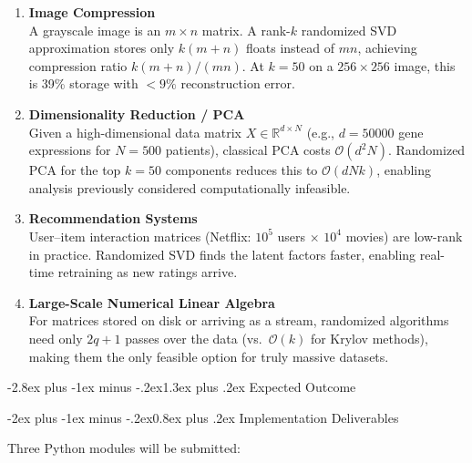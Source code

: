 \documentclass[12pt,a4paper]{article}
\makeatletter
\renewcommand{\section}{\@startsection{section}{1}{\z@}
  {-2.8ex plus -1ex minus -.2ex}{1.3ex plus .2ex}
  {\large\bfseries\color{deepblue}}}
\renewcommand{\subsection}{\@startsection{subsection}{2}{\z@}
  {-2ex plus -1ex minus -.2ex}{0.8ex plus .2ex}
  {\normalsize\bfseries\color{deepblue}}}
\makeatother
\begin{document}
\begin{enumerate}[leftmargin=1.8em, itemsep=5pt]
  \item \textbf{Image Compression}\\
    A grayscale image is an $m \times n$ matrix. A rank-$k$ randomized SVD approximation
    stores only $k(m+n)$ floats instead of $mn$, achieving compression ratio $k(m+n)/(mn)$.
    At $k=50$ on a $256 \times 256$ image, this is 39\% storage with $<9\%$ reconstruction error.

  \item \textbf{Dimensionality Reduction / PCA}\\
    Given a high-dimensional data matrix $X \in \mathbb{R}^{d \times N}$ (e.g., $d=50000$
    gene expressions for $N=500$ patients), classical PCA costs $\mathcal{O}(d^2 N)$.
    Randomized PCA for the top $k=50$ components reduces this to $\mathcal{O}(dNk)$,
    enabling analysis previously considered computationally infeasible.

  \item \textbf{Recommendation Systems}\\
    User--item interaction matrices (Netflix: $10^5$ users $\times$ $10^4$ movies) are
    low-rank in practice. Randomized SVD finds the latent factors faster, enabling
    real-time retraining as new ratings arrive.

  \item \textbf{Large-Scale Numerical Linear Algebra}\\
    For matrices stored on disk or arriving as a stream, randomized algorithms need only
    $2q+1$ passes over the data (vs.\ $\mathcal{O}(k)$ for Krylov methods), making them
    the only feasible option for truly massive datasets.
\end{enumerate}

\section{Expected Outcome}

\subsection{Implementation Deliverables}

Three Python modules will be submitted:
\end{document}
